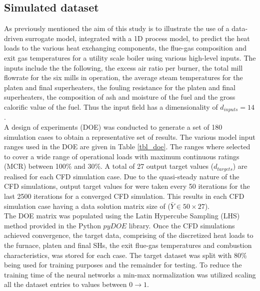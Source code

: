 \documentclass[a4paper,fleqn]{cas-sc}
\begin{document}
\subsection{Simulated dataset}
As previously mentioned the aim of this study is to illustrate the use of a data-driven surrogate model, integrated with a 1D process model, to predict the heat loads to the various heat exchanging components, the flue-gas composition and exit gas temperatures for a utility scale boiler using various high-level inputs. The inputs include the the following, the excess air ratio per burner, the total mill flowrate for the six mills in operation, the average steam temperatures for the platen and final superheaters, the fouling resistance for the platen and final superheaters, the composition of ash and moisture of the fuel and the gross calorific value of the fuel. Thus the input field has a dimensionality of $d_{inputs}=14$.\\

A design of experiments (DOE) was conducted to generate a set of 180 simulation cases to obtain a representative set of results. The various model input ranges used in the DOE are given in Table \ref{tbl_doe}. The ranges where selected to cover a wide range of operational loads with maximum continuous ratings (MCR) between 100\% and 30\%. A total of 27 output target values ($d_{targets}$) are realised for each CFD simulation case. Due to the quasi-steady nature of the CFD simulations, output target values for were taken every 50 iterations for the last 2500 iterations for a converged CFD simulation. This results in each CFD simulation case having a data solution matrix size of ($\bar{Y}\in50\times27$).\\

The DOE matrix was populated using the Latin Hypercube Sampling (LHS) method provided in the Python $pyDOE$ library. Once the CFD simulations achieved convergence, the target data, comprising of the discretized heat loads to the furnace, platen and final SHs, the exit flue-gas temperatures and combustion characteristics, was stored for each case. The target dataset was split with 80\% being used for training purposes and the remainder for testing. To reduce the training time of the neural networks a min-max normalization was utilized scaling all the dataset entries to values between $0\rightarrow1$.\\
\end{document}
